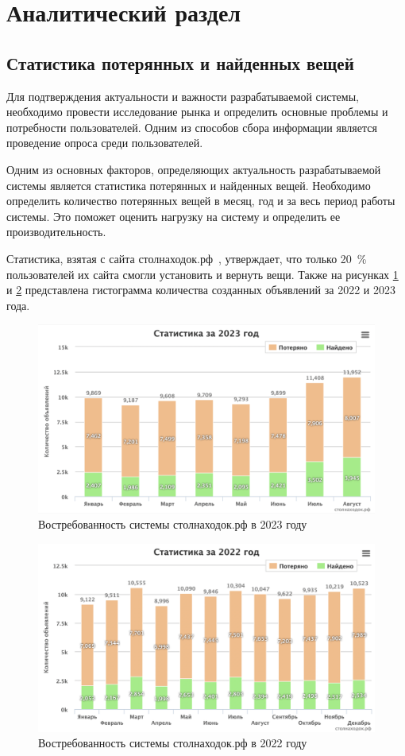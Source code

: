 \section{Аналитический раздел}
\label{sec:analytics}

\subsection{Статистика потерянных и найденных вещей}

Для подтверждения актуальности и важности разрабатываемой системы, необходимо провести исследование рынка и определить основные проблемы и потребности пользователей. Одним из способов сбора информации является проведение опроса среди пользователей.

Одним из основных факторов, определяющих актуальность разрабатываемой системы является статистика потерянных и найденных вещей. Необходимо определить количество потерянных вещей в месяц, год и за весь период работы системы. Это поможет оценить нагрузку на систему и определить ее производительность.

Статистика, взятая с сайта столнаходок.рф~\cite{bib:stol_nahodok}, утверждает, что только 20~\% пользователей их сайта смогли установить и вернуть вещи. Также на рисунках \ref{fig:chart2023} и \ref{fig:chart2022} представлена гистограмма количества созданных объявлений за 2022 и 2023 года.

\begin{figure}[htb]
	\centering
	\includegraphics[width=.6\textwidth]{images/chart2023}
	\parskip=6pt
	\caption{Востребованность системы столнаходок.рф в 2023 году}
	\label{fig:chart2023}
\end{figure}

\begin{figure}[htb]
	\centering
	\includegraphics[width=.6\textwidth]{images/chart2022}
	\parskip=6pt
	\caption{Востребованность системы столнаходок.рф в 2022 году}
	\label{fig:chart2022}
\end{figure}

